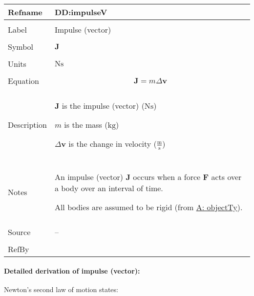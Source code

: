 \documentclass[12pt]{article}
\begin{document}
\vspace{\baselineskip}
\noindent
\begin{minipage}{\textwidth}
\begin{tabular}{>{\raggedright}p{}>{\raggedright\arraybackslash}p{}}
\toprule \textbf{Refname} & \textbf{DD:impulseV}
\label{DD:impulseV}
\\ \midrule \\
Label & Impulse (vector)
        
\\ \midrule \\
Symbol & $\mathbf{J}$
         
\\ \midrule \\
Units & $\text{N}\text{s}$
        
\\ \midrule \\
Equation & \begin{displaymath}
           \mathbf{J}=m Δ\mathbf{v}
           \end{displaymath}
\\ \midrule \\
Description & \begin{symbDescription}
              \item{$\mathbf{J}$ is the impulse (vector) ($\text{N}\text{s}$)}
              \item{$m$ is the mass (${\text{kg}}$)}
              \item{$Δ\mathbf{v}$ is the change in velocity ($\frac{\text{m}}{\text{s}}$)}
              \end{symbDescription}
\\ \midrule \\
Notes & An impulse (vector) $\mathbf{J}$ occurs when a force $\mathbf{F}$ acts over a body over an interval of time.
        
        All bodies are assumed to be rigid (from \hyperref[assumpOT]{A: objectTy}).
        
\\ \midrule \\
Source & --
         
\\ \midrule \\
RefBy & 
\\ \bottomrule
\end{tabular}
\end{minipage}
\paragraph{Detailed derivation of impulse (vector):}
\label{DD:impulseVDeriv}
Newton's second law of motion states:
\end{document}
